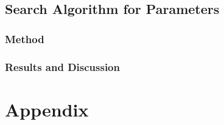 \documentclass[a4paper, oneside, 12pt]{article}
\begin{document}
\newpage
\subsection{Search Algorithm for Parameters}
\subsubsection{Method}
\subsubsection{Results and Discussion}

\newpage
\section*{Appendix}

\begin{lstlisting}[language=MATLAB]
\end{lstlisting}

\newpage


\end{document}
